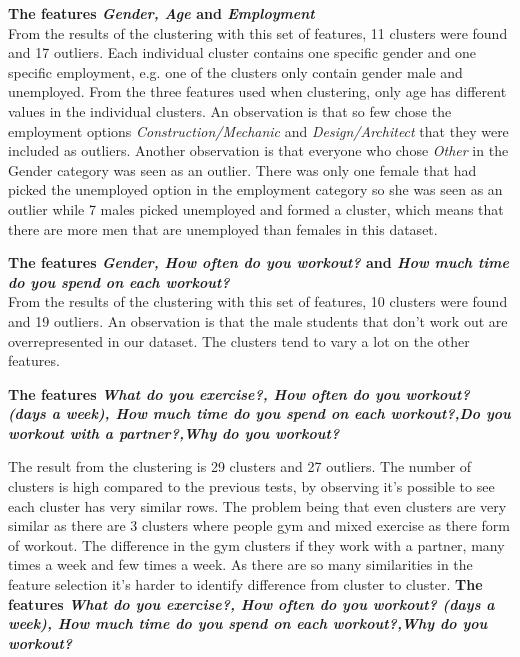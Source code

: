 \documentclass[a4paper]{article}
\begin{document}
\textbf{The features \textit{Gender, Age} and \textit{Employment}}\newline\\
From the results of the clustering with this set of features, 11 clusters were found and 17 outliers. 
Each individual cluster contains one specific gender and one specific employment, e.g. one of the 
clusters only contain gender male and unemployed. From the three features used when clustering, only age has different values in the individual clusters. An observation is that so few chose the employment options \textit{Construction/Mechanic} and \textit{Design/Architect} that they were included as outliers. Another observation is that everyone who chose \textit{Other} in the Gender category was seen as an outlier. There was only one female that had picked the unemployed option in the employment category so she was seen as an outlier while 7 males picked unemployed and formed a cluster, which means that there are more men that are unemployed than females in this dataset.

\textbf{The features \textit{Gender, How often do you workout?} and \textit{How much time do you spend on each workout?}}\newline\\
From the results of the clustering with this set of features, 10 clusters were found and 19 outliers. An observation is that the male students that don't work out are overrepresented in our dataset. The clusters tend to vary a lot on the other features.

\textbf{The features \textit{What do you exercise?, How often do you workout? (days a week), How much time do you spend on each workout?,Do you workout with a partner?,Why do you workout?}}

The result from the clustering is 29 clusters and 27 outliers. The number of clusters is high compared to the previous tests, by observing it's possible to see each cluster has very similar rows. The problem being that even clusters are very similar as there are 3 clusters where people gym and mixed exercise as there form of workout. The difference in the gym clusters if they work with a partner, many times a week and few times a week. As there are so many similarities in the feature selection it's harder to identify difference from cluster to cluster. %
\newpage
\textbf{The features \textit{What do you exercise?, How often do you workout? (days a week), How much time do you spend on each workout?,Why do you workout?}}
\end{document}
